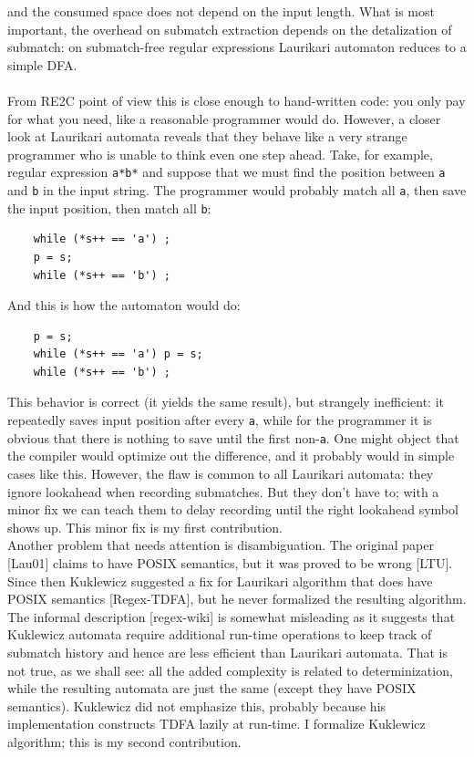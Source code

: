 \documentclass{article}
\theoremstyle{definition}
\begin{document}
\begin{multicols}{2}
and the consumed space does not depend on the input length.
What is most important, the overhead on submatch extraction depends on the detalization of submatch:
on submatch-free regular expressions Laurikari automaton reduces to a simple DFA.
\\ \\
From RE2C point of view this is close enough to hand-written code:
you only pay for what you need, like a reasonable programmer would do.
However, a closer look at Laurikari automata reveals that
they behave like a very strange programmer who is unable to think even one step ahead.
Take, for example, regular expression \texttt{a*b*}
and suppose that we must find the position between \texttt{a} and \texttt{b} in the input string.
The programmer would probably match all \texttt{a}, then save the input position, then match all \texttt{b}:

\begin{small}
\begin{verbatim}
    while (*s++ == 'a') ;
    p = s;
    while (*s++ == 'b') ;
\end{verbatim}
\end{small}

And this is how the automaton would do:

\begin{small}
\begin{verbatim}
    p = s;
    while (*s++ == 'a') p = s;
    while (*s++ == 'b') ;
\end{verbatim}
\end{small}

This behavior is correct (it yields the same result), but strangely inefficient:
it repeatedly saves input position after every \texttt{a},
while for the programmer it is obvious that there is nothing to save until the first non-\texttt{a}.
One might object that the compiler would optimize out the difference,
and it probably would in simple cases like this.
However, the flaw is common to all Laurikari automata:
they ignore lookahead when recording submatches.
But they don't have to; with a minor fix we can teach them
to delay recording until the right lookahead symbol shows up.
This minor fix is my first contribution.
\\

Another problem that needs attention is disambiguation.
The original paper [Lau01] claims to have POSIX semantics, but it was proved to be wrong [LTU].
Since then Kuklewicz suggested a fix for Laurikari algorithm that does have POSIX semantics [Regex-TDFA], but he never formalized the resulting algorithm.
The informal description [regex-wiki] is somewhat misleading as it suggests that Kuklewicz automata
require additional run-time operations to keep track of submatch history and hence are less efficient than Laurikari automata.
That is not true, as we shall see: all the added complexity is related to determinization,
while the resulting automata are just the same (except they have POSIX semantics).
Kuklewicz did not emphasize this, probably because his implementation constructs TDFA lazily at run-time.
I formalize Kuklewicz algorithm; this is my second contribution.
\\


\end{multicols}
\end{document}
